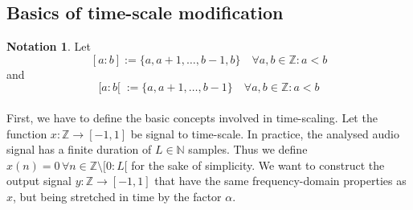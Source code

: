 \documentclass[letterpaper]{article}
\theoremstyle{definition}
\newtheorem*{notation}{Notation}
\theoremstyle{remark}
\begin{document}
\subsection{Basics of time-scale modification}
\begin{notation}
	Let
	\[[a:b]:=\{a,a+1,\dots,b-1,b\}\quad\forall a,b\in\mathbb{Z}:a<b\]
	and
	\[[a:b[\;:=\{a,a+1,\dots,b-1\}\quad\forall a,b\in\mathbb{Z}:a<b\]
\end{notation}

\paragraph{}
First, we have to define the basic concepts involved in time-scaling. Let the
function \(x:\mathbb{Z}\to[-1, 1]\) be signal to time-scale. In practice,
the analysed audio signal has a finite duration of \(L\in\mathbb{N}\) samples.
Thus we define \(x(n)=0\,\forall n\in\mathbb{Z}\setminus [0:L[ \) for the sake
of simplicity. We want to construct the output signal
\(y:\mathbb{Z}\to[-1, 1]\) that have the same frequency-domain properties as
\(x\), but being stretched in time by the factor \(\alpha\).
\end{document}
